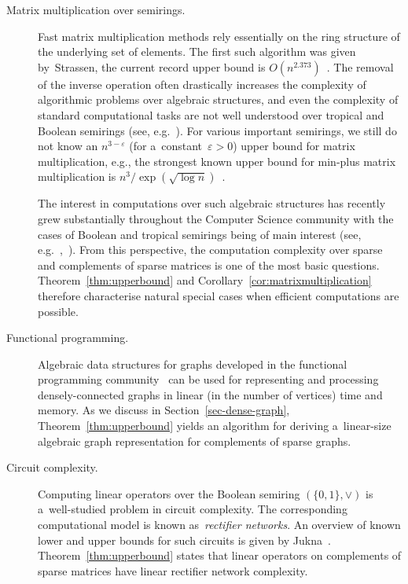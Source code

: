 \documentclass{toc}
\begin{document}
\begin{description}

\item[Matrix multiplication over semirings.] Fast matrix
multiplication methods rely essentially on the ring structure of the underlying
set of elements. The first such algorithm was given by~Strassen,
the current record upper bound is
$O(n^{2.373})$~\cite{DBLP:conf/stoc/Williams12, DBLP:conf/issac/Gall14a}.
The removal of the inverse operation often drastically increases the complexity
of algorithmic problems over algebraic structures, and even the complexity of
standard computational tasks are not well understood over tropical and
Boolean semirings (see, e.g.~\cite{Williams14,GrigorievP15}).
For various important semirings,
we still do not know an $n^{3-\varepsilon}$ (for a~constant~$\varepsilon>0$)
upper bound for matrix multiplication, e.g., the strongest known upper bound for
min-plus matrix multiplication is $n^3/\exp(\sqrt{\log n})$~\cite{Williams14}.

The interest in computations over such algebraic structures has
recently grew substantially throughout the
Computer Science community with the cases of Boolean and
tropical semirings being of main interest (see,
e.g.~,~\cite{Jukna16,Williams14,butkovic10systems}).
From this perspective, the computation complexity over sparse and complements of
sparse matrices is one of the most basic questions.
Theorem~\ref{thm:upperbound} and Corollary~\ref{cor:matrixmultiplication}
therefore characterise natural special
cases when efficient computations are possible.

\item[Functional programming.]
Algebraic data structures for graphs developed in the functional programming
community~\cite{mokhov2017algebraic} can be used for representing and processing
densely-connected graphs in linear (in the number of vertices) time and memory.
As we discuss in Section~\ref{sec-dense-graph}, Theorem~\ref{thm:upperbound}
yields an algorithm for deriving a~linear-size algebraic graph representation
for complements of sparse graphs.

\item[Circuit complexity.] Computing linear operators over
the Boolean semiring $(\{0,1\}, \lor)$ is a~well-studied problem
in circuit complexity. The corresponding computational model is known
as~\emph{rectifier networks}. An overview of known lower and upper bounds for
such circuits is given by Jukna~\cite[Section~13.6]{DBLP:books/daglib/0028687}.
Theorem~\ref{thm:upperbound} states that linear operators on complements of
sparse matrices have linear rectifier network complexity.

\end{description}
\end{document}

